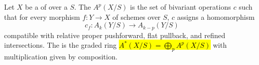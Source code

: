 \begin{definition} \label{definition:relative_operational_chow_ring_of_a_finite_type_scheme_over_a_noetherian_base}
Let $X$ be a  of  over a  $S$.
The  $A^p(X/S)$ is the set of bivariant operations $c$ such that for every morphism $f: Y \to X$ of schemes over $S$, $c$ assigns a homomorphism
\[ c_f : A_k(Y/S) \to A_{k-p}(Y/S) \]
compatible with relative proper pushforward, flat pullback, and refined intersections. The  is the graded ring \hl{$A^*(X/S) = \bigoplus_p A^p(X/S)$} with multiplication given by composition.
\end{definition}